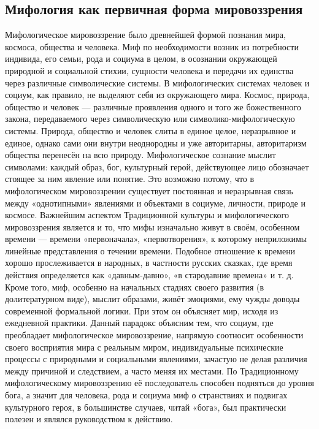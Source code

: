 \documentclass[12pt]{article}
\begin{document}
\subsection{Мифология как первичная форма мировоззрения}
Мифологическое мировоззрение было древнейшей формой познания мира, космоса, общества и человека. Миф
по  необходимости  возник  из  потребности  индивида,  его  семьи,  рода  и  социума  в  целом,  в  осознании
окружающей природной и социальной стихии, сущности человека и передачи их единства через различные
символические системы. В мифологических системах человек и социум, как правило, не выделяют себя из
окружающего  мира.  Космос,  природа,  общество  и  человек  —  различные  проявления  одного  и  того  же
божественного  закона,  передаваемого  через  символическую  или  символико-мифологическую  системы.
Природа,  общество  и  человек  слиты  в  единое  целое,  неразрывное  и  единое,  однако  сами  они  внутри
неоднородны и уже авторитарны, авторитаризм общества перенесён на всю природу.
Мифологическое  сознание  мыслит  символами:  каждый  образ,  бог,  культурный  герой,  действующее  лицо
обозначает стоящее за ним явление или понятие. Это возможно потому, что в мифологическом мировоззрении
существует  постоянная  и  неразрывная  связь  между  «однотипными»  явлениями  и  объектами  в  социуме,
личности, природе и космосе.
Важнейшим аспектом Традиционной культуры и мифологического мировоззрения является и то, что мифы
изначально  живут  в  своём,  особенном  времени  —  времени  «первоначала»,  «первотворения»,  к  которому
неприложимы  линейные  представления  о  течении  времени.  Подобное  отношение  к  времени  хорошо
прослеживается  в  народных,  в  частности русских  сказках,  где время  действия  определяется как «давным-давно», «в стародавние времена» и т. д.
Кроме того, миф, особенно на начальных стадиях своего развития (в долитературном виде), мыслит образами,
живёт эмоциями, ему чужды доводы современной формальной логики. При этом он объясняет мир, исходя из
ежедневной  практики.  Данный  парадокс  объясним  тем,  что  социум,  где  преобладает  мифологическое
мировоззрение, напрямую соотносит особенности своего восприятия мира с реальным миром, индивидуальные
психические процессы с природными и социальными явлениями, зачастую не делая различия между причиной
и следствием, а часто меняя их местами.
По Традиционному мифологическому мировоззрению её последователь способен подняться до уровня бога, а
значит для человека, рода и социума миф о странствиях и подвигах культурного героя, в большинстве случаев,
читай «бога», был практически полезен и являлся руководством к действию.
\end{document}
